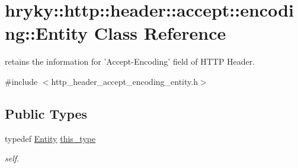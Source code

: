 \hypertarget{classhryky_1_1http_1_1header_1_1accept_1_1encoding_1_1_entity}{\section{hryky\-:\-:http\-:\-:header\-:\-:accept\-:\-:encoding\-:\-:Entity Class Reference}
\label{classhryky_1_1http_1_1header_1_1accept_1_1encoding_1_1_entity}
}


retains the information for 'Accept-\/\-Encoding' field of H\-T\-T\-P Header.  




{\ttfamily \#include $<$http\-\_\-header\-\_\-accept\-\_\-encoding\-\_\-entity.\-h$>$}

\subsection*{Public Types}
\begin{DoxyCompactItemize}
\item 
\hypertarget{classhryky_1_1http_1_1header_1_1accept_1_1encoding_1_1_entity_ab5044b61d867d39fcb6d93146d85226a}{typedef \hyperlink{classhryky_1_1http_1_1header_1_1accept_1_1encoding_1_1_entity}{Entity} \hyperlink{classhryky_1_1http_1_1header_1_1accept_1_1encoding_1_1_entity_ab5044b61d867d39fcb6d93146d85226a}{this\-\_\-type}}\label{classhryky_1_1http_1_1header_1_1accept_1_1encoding_1_1_entity_ab5044b61d867d39fcb6d93146d85226a}

\begin{DoxyCompactList}\small\item\em self. \end{DoxyCompactList}\end{DoxyCompactItemize}
